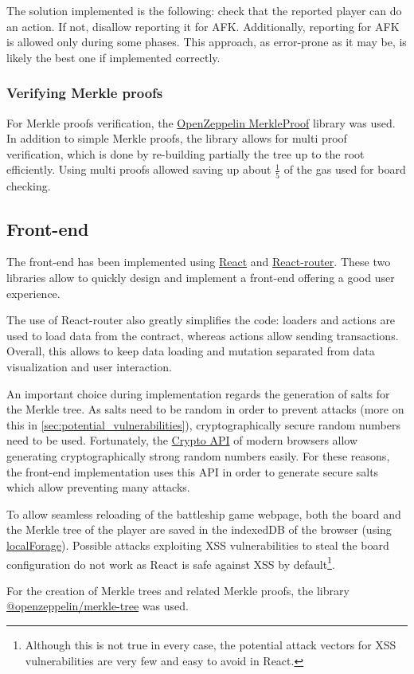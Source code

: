 The solution implemented is the following: check that the reported player can
do an action. If not, disallow reporting it for AFK. Additionally, reporting
for AFK is allowed only during some phases. This approach, as error-prone as it
may be, is likely the best one if implemented correctly.

\subsubsection{Verifying Merkle proofs}
For Merkle proofs verification, the
\href{https://docs.openzeppelin.com/contracts/4.x/api/utils\#MerkleProof}{\color{blue}OpenZeppelin
	MerkleProof} library was used. In addition to simple Merkle proofs, the library
allows for multi proof verification, which is done by re-building partially the
tree up to the root efficiently. Using multi proofs allowed saving up about
$\frac{1}{5}$ of the gas used for board checking.

\subsection{Front-end}
\label{sec:implementation-front-end}
The front-end has been implemented using \href{https://react.dev/}{\color{blue}
	React} and \href{https://reactrouter.com/en/main}{\color{blue} React-router}.
These two libraries allow to quickly design and implement a front-end offering
a good user experience.

The use of React-router also greatly simplifies the code: loaders and actions
are used to load data from the contract, whereas actions allow sending
transactions. Overall, this allows to keep data loading and mutation separated
from data visualization and user interaction.

An important choice during implementation regards the generation of salts for
the Merkle tree. As salts need to be random in order to prevent attacks (more
on this in \cref{sec:potential_vulnerabilities}), cryptographically secure
random numbers need to be used. Fortunately, the
\href{https://developer.mozilla.org/en-US/docs/Web/API/Crypto}{\color{blue}Crypto
	API} of modern browsers allow generating cryptographically strong random
numbers easily. For these reasons, the front-end implementation uses this API
in order to generate secure salts which allow preventing many attacks.

To allow seamless reloading of the battleship game webpage, both the board and
the Merkle tree of the player are saved in the indexedDB of the browser (using
\href{https://github.com/localForage/localForage}{\color{blue}localForage}).
Possible attacks exploiting XSS vulnerabilities to steal the board
configuration do not work as React is safe against XSS by
default\footnote{Although this is not true in every case, the potential attack
	vectors for XSS vulnerabilities are very few and easy to avoid in React.}.

For the creation of Merkle trees and related Merkle proofs, the library
\href{https://github.com/OpenZeppelin/merkle-tree}{\color{blue}@openzeppelin/merkle-tree}
was used.

